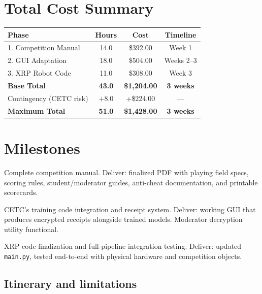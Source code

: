 \documentclass[a4paper]{article}
\begin{document}
\section*{Total Cost Summary}

\begin{center}
\begin{tabular}{lccc}
\toprule
\textbf{Phase} & \textbf{Hours} & \textbf{Cost} & \textbf{Timeline} \\
\midrule
1. Competition Manual & 14.0 & \$392.00 & Week 1 \\
2. GUI Adaptation & 18.0 & \$504.00 & Weeks 2--3 \\
3. XRP Robot Code & 11.0 & \$308.00 & Week 3 \\
\midrule
\textbf{Base Total} & \textbf{43.0} & \textbf{\$1,204.00} & \textbf{3 weeks} \\
\midrule
Contingency (CETC risk) & +8.0 & +\$224.00 & --- \\
\midrule
\textbf{Maximum Total} & \textbf{51.0} & \textbf{\$1,428.00} & \textbf{3 weeks} \\
\bottomrule
\end{tabular}
\end{center}

\section*{Milestones}

\begin{description}[leftmargin=!,labelwidth=5em]
    \item[26/05/2026] Complete competition manual. Deliver: finalized PDF with playing field specs, scoring rules, student/moderator guides, anti-cheat documentation, and printable scorecards.

    \item[June 9- June 12] CETC's training code integration and receipt system. Deliver: working GUI that produces encrypted receipts alongside trained models. Moderator decryption utility functional.

    \item[June 19 - June 23] XRP code finalization and full-pipeline integration testing. Deliver: updated \texttt{main.py}, tested end-to-end with physical hardware and competition objects.
\end{description}

\subsection*{Itinerary and limitations}
\end{document}
